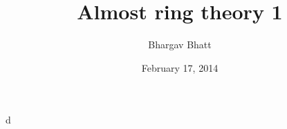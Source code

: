 \documentclass{article}
\title{Almost ring theory 1}
\author{Bhargav Bhatt}
\date{February 17, 2014}
\begin{document}
\maketitle





d
\end{document}
